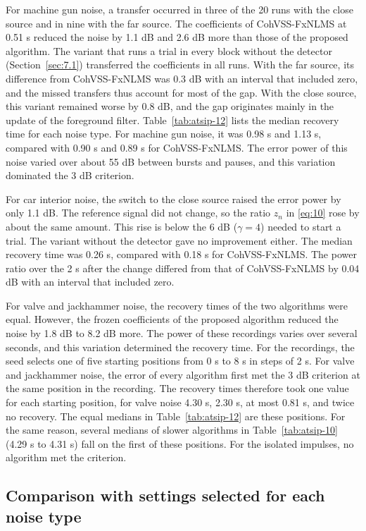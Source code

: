 \documentclass[sip,biber]{now-journal}
\begin{document}
For machine gun noise, a transfer occurred in three of the 20 runs with the close source and in nine with the far source. The coefficients of CohVSS-FxNLMS at 0.51 s reduced the noise by 1.1 dB and 2.6 dB more than those of the proposed algorithm. The variant that runs a trial in every block without the detector (Section~\ref{sec:7.1}) transferred the coefficients in all runs. With the far source, its difference from CohVSS-FxNLMS was 0.3 dB with an interval that included zero, and the missed transfers thus account for most of the gap. With the close source, this variant remained worse by 0.8 dB, and the gap originates mainly in the update of the foreground filter. Table~\ref{tab:atsip-12} lists the median recovery time for each noise type. For machine gun noise, it was 0.98 s and 1.13 s, compared with 0.90 s and 0.89 s for CohVSS-FxNLMS. The error power of this noise varied over about 55 dB between bursts and pauses, and this variation dominated the 3 dB criterion.

For car interior noise, the switch to the close source raised the error power by only 1.1 dB. The reference signal did not change, so the ratio \(z_n\) in \eqref{eq:10} rose by about the same amount. This rise is below the 6 dB (\(\gamma = 4\)) needed to start a trial. The variant without the detector gave no improvement either. The median recovery time was 0.26 s, compared with 0.18 s for CohVSS-FxNLMS. The power ratio over the 2 s after the change differed from that of CohVSS-FxNLMS by 0.04 dB with an interval that included zero.

For valve and jackhammer noise, the recovery times of the two algorithms were equal. However, the frozen coefficients of the proposed algorithm reduced the noise by 1.8 dB to 8.2 dB more. The power of these recordings varies over several seconds, and this variation determined the recovery time. For the recordings, the seed selects one of five starting positions from 0 s to 8 s in steps of 2 s. For valve and jackhammer noise, the error of every algorithm first met the 3 dB criterion at the same position in the recording. The recovery times therefore took one value for each starting position, for valve noise 4.30 s, 2.30 s, at most 0.81 s, and twice no recovery. The equal medians in Table~\ref{tab:atsip-12} are these positions. For the same reason, several medians of slower algorithms in Table~\ref{tab:atsip-10} (4.29 s to 4.31 s) fall on the first of these positions. For the isolated impulses, no algorithm met the criterion.

\hypertarget{sec:6.3}{%
\subsection{Comparison with settings selected for each noise type}\label{sec:6.3}}
\end{document}
